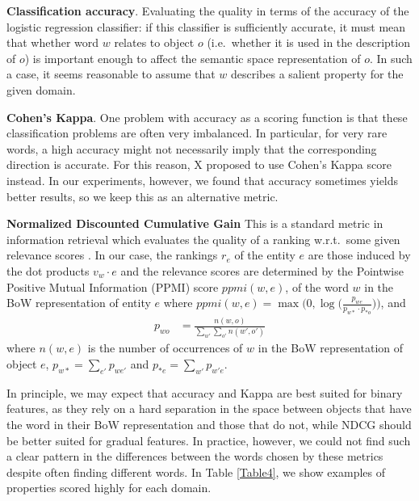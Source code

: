 \noindent \textbf{Classification accuracy}. Evaluating the quality in terms of the accuracy of the logistic regression classifier: if this classifier is sufficiently accurate, it must mean that whether word $w$ relates to object $o$ (i.e.\ whether it is used in the description of $o$) is important enough to affect the semantic space representation of $o$. In such a case, it seems reasonable to assume that $w$ describes a salient property for the given domain.%
\smallskip

\noindent \textbf{Cohen's Kappa}. One problem with accuracy as a scoring function is that these classification problems are often very imbalanced. In particular, for very rare words, a high accuracy might not necessarily imply that the corresponding direction is accurate. For this reason, X proposed to use Cohen's Kappa score instead. In our experiments, however, we found that accuracy sometimes yields better results, so we keep this as an alternative metric. %
\smallskip

\noindent \textbf{Normalized Discounted Cumulative Gain}
This is a standard metric in information retrieval which evaluates the quality of a ranking w.r.t.\ some given relevance scores \cite{jarvelin2002cumulated}.  In our case, the rankings $r_e$ of the entity $e$ are those induced by the dot products $v_w \cdot e$ and the relevance scores are determined by the Pointwise Positive Mutual Information (PPMI) score $\textit{ppmi}(w,e)$, of the word $w$ in the BoW representation of entity $e$ where
$\textit{ppmi}(w,e) = \max \big(0, \log\big(\frac{p_{we}}{p_{w*} \cdotp p_{*o}}\big)\big)$, and
\begin{align*}
p_{wo} &= \frac{n(w, o)}{\sum_{w'} \sum_{o'} n(w', o')}
\end{align*}
where $n(w,e)$ is the number of occurrences of $w$ in the BoW representation of object $e$, $p_{w*} = \sum_{e'} p_{we'}$ and $p_{*e} = \sum_{w'} p_{w'e}$. %
\smallskip

In principle, we may expect that accuracy and Kappa are best suited for binary features, as they rely on a hard separation in the space between objects that have the word in their BoW representation and those that do not, while NDCG should be better suited for gradual features. In practice, however, we could not find such a clear pattern in the differences between the words chosen by these metrics despite often finding different words. In Table \ref{Table4}, we show examples of properties scored highly for each domain.

